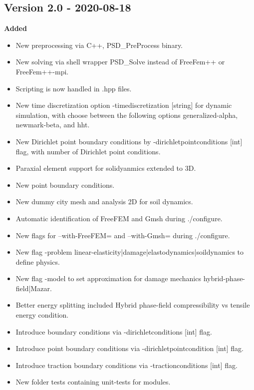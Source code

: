 \documentclass{report}
\begin{document}
\subsection{Version 2.0 - 2020-08-18}
\textbf{Added}
\begin{itemize}
    \item New preprocessing via C++, {\ttfamily PSD\_PreProcess} binary.
    \item New solving via shell wrapper {\ttfamily PSD\_Solve} instead of {\ttfamily FreeFem++} or {\ttfamily FreeFem++-mpi}.    
    \item Scripting is now handled in {\ttfamily .hpp} files.
    \item New time discretization option {\ttfamily -timediscretization [string]} for dynamic simulation, with {\ttfamily [string]} choose between the following options {\ttfamily generalized-alpha}, {\ttfamily newmark-beta}, and {\ttfamily hht}.
    \item New Dirichlet point boundary conditions  by {\ttfamily -dirichletpointconditions [int]} flag, with {\ttfamily  [int]} number of Dirichlet point conditions.
    \item Paraxial element support for solidyanmics extended to 3D.
    \item New point boundary conditions.
    \item New dummy city mesh and analysis 2D for soil dynamics. 
    \item Automatic identification of FreeFEM and Gmsh during {\ttfamily./configure}.
     \item New flags for {\ttfamily --with-FreeFEM=} and {\ttfamily--with-Gmsh=} during {\ttfamily./configure}.
     \item New flag {\ttfamily -problem linear-elasticity|damage|elastodynamics|soildynamics} to define physics.
     \item New flag {\ttfamily -model} to set approximation for damage mechanics {\ttfamily hybrid-phase-field|Mazar}.
    \item Better energy splitting included Hybrid phase-field compressibility vs tensile energy condition.
    \item Introduce boundary conditions via {\ttfamily -dirichletconditions [int]} flag. 
    \item Introduce point boundary conditions via {\ttfamily -dirichletpointcondition [int]} flag. 
    \item Introduce traction boundary conditions via  {\ttfamily -tractionconditions [int]} flag.
    \item New folder {\ttfamily tests} containing unit-tests for modules.

\end{itemize}
\end{document}
